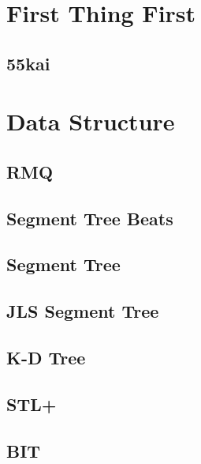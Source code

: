 \section{First Thing First}
\subsection{55kai}
\raggedbottom
\hrulefill

\section{Data Structure}
\subsection{RMQ}
\raggedbottom
\hrulefill
\subsection{Segment Tree Beats}
\raggedbottom
\hrulefill
\subsection{Segment Tree}
\raggedbottom
\hrulefill
\subsection{JLS Segment Tree}
\raggedbottom
\hrulefill
\subsection{K-D Tree}
\raggedbottom
\hrulefill
\subsection{STL+}
\raggedbottom
\hrulefill
\subsection{BIT}
\raggedbottom
\hrulefill
